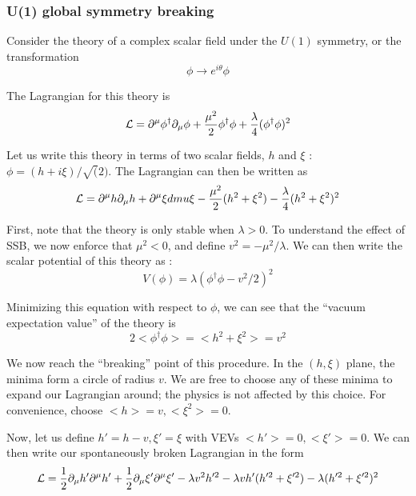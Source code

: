 \subsubsection{U(1) global symmetry breaking}

Consider the theory of a complex scalar field under the $U(1)$ symmetry, or the transformation
\begin{equation}
\phi \rightarrow e^{i\theta} \phi
\end{equation}

The Lagrangian for this theory is
\begin{equation}
\mathcal{L} = \partial^\mu \phi^{\dag} \partial_\mu \phi + \frac{\mu^2}{2} \phi^{\dag} \phi + \frac{\lambda}{4} (\phi^\dag \phi)^2
\end{equation}

Let us write this theory in terms of two scalar fields, $h$ and $\xi$ : $\phi = (h + i\xi) / \sqrt(2)$.
The Lagrangian can then be written as
\begin{equation}
\mathcal{L} = \partial^\mu h \partial_\mu h + \partial^\mu \xi dmu \xi - \frac{\mu^2}{2} (h^2 + \xi^2) - \frac{\lambda}{4}(h^2 + \xi^2)^2
\end{equation}

First, note that the theory is only stable when $\lambda > 0$.
To understand the effect of SSB, we now enforce that $\mu^2 < 0$, and define $v^2 = -\mu^2/\lambda$.
We can then write the scalar potential of this theory as :
\begin{equation}
V(\phi) = \lambda (\phi^\dag \phi - v^2/2)^2
\end{equation}

Minimizing this equation with respect to $\phi$, we can see that the ``vacuum expectation value'' of the theory is
\begin{equation}
2<\phi^\dag \phi> = <h^2 + \xi^2 > = v^2
\end{equation}

We now reach the ``breaking'' point of this procedure.
In the $(h, \xi)$ plane, the minima form a circle of radius $v$.
We are free to choose any of these minima to expand our Lagrangian around; the physics is not affected by this choice.
For convenience, choose $<h> = v, <\xi^2> = 0$.

Now, let us define $h' = h - v , \xi' = \xi $ with VEVs $<h'> = 0 , <\xi'> = 0$.
We can then write our spontaneously broken Lagrangian in the form
\begin{equation}
\mathcal{L} = \frac{1}{2} \partial_\mu h' \partial^\mu h' +  \frac{1}{2} \partial_\mu \xi' \partial^\mu \xi' - \lambda v^2 h'^2 - \lambda v h' (h'^2 + \xi'^2 ) - \lambda (h'^2 + \xi'^2)^2
\end{equation}
